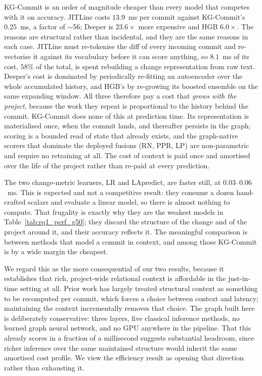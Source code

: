 \documentclass[final,5p,times,twocolumn]{elsarticle}
\theoremstyle{plain}
\begin{document}
KG-Commit is an order of magnitude cheaper than every model that competes with
it on accuracy. JITLine costs $13.9$~ms per commit against KG-Commit's $0.25$~ms, a
factor of $\sim$56; Deeper is $23.6\times$ more expensive and HGB $6.0\times$. The
reasons are structural rather than incidental, and they are the same reasons in each
case. JITLine must re-tokenise the diff of every incoming commit and re-vectorise it
against its vocabulary before it can score anything, so $8.1$~ms of its cost, $58\%$ of
the total, is spent rebuilding a change representation from raw text. Deeper's cost is
dominated by periodically re-fitting an autoencoder over the whole accumulated history,
and HGB's by re-growing its boosted ensemble on the same expanding window. All three
therefore pay a cost that \emph{grows with the project}, because the work they repeat
is proportional to the history behind the commit. KG-Commit does none of this at
prediction time. Its representation is materialised once, when the commit lands, and
thereafter persists in the graph; scoring is a bounded read of state that already
exists, and the graph-native scorers that dominate the deployed fusions (RN, PPR, LP)
are non-parametric and require no retraining at all. The cost of context is paid once
and amortised over the life of the project rather than re-paid at every prediction.

The two change-metric learners, LR and LApredict, are faster still, at
$0.03$--$0.06$~ms. This is expected and not a competitive result: they consume a dozen
hand-crafted scalars and evaluate a linear model, so there is almost nothing to
compute. That frugality is exactly why they are the weakest models in
Table~\ref{tab:rq1_perf_g50}; they discard the structure of the change and of the
project around it, and their accuracy reflects it. The meaningful comparison is between
methods that model a commit in context, and among those KG-Commit is by a wide margin
the cheapest.

We regard this as the more consequential of our two results, because it establishes
that rich, project-wide relational context is affordable in the just-in-time setting at
all. Prior work has largely treated structural context as something to be recomputed
per commit, which forces a choice between context and latency; maintaining the context
incrementally removes that choice. The graph built here is deliberately conservative:
three layers, five classical inference methods, no learned graph neural network, and no
GPU anywhere in the pipeline. That this already scores in a fraction of a millisecond
suggests substantial headroom, since richer inference over the same maintained
structure would inherit the same amortised cost profile. We view the efficiency result
as opening that direction rather than exhausting it.
\end{document}

